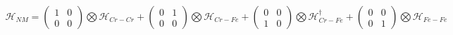 \documentclass{article}
\begin{document}
\begin{align*}
\mathcal{H}_{NM} =
\left( \begin{array}{cc}
1 & 0 \\
0 & 0
\end{array} \right) \bigotimes \mathcal{H}_{Cr-Cr} +
\left( \begin{array}{cc}
0 & 1 \\
0 & 0
\end{array} \right) \bigotimes \mathcal{H}_{Cr-Fe} +
\left( \begin{array}{cc}
0 & 0 \\
1 & 0
\end{array} \right) \bigotimes \mathcal{H}^\dagger_{Cr-Fe} +
\left( \begin{array}{cc}
0 & 0 \\
0 & 1
\end{array} \right) \bigotimes \mathcal{H}_{Fe-Fe}
\end{align*}
\end{document}
